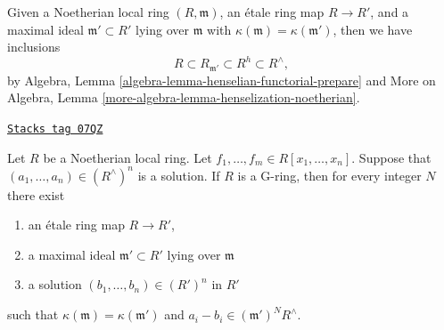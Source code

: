 Given a Noetherian local ring $(R, \mathfrak m)$, an \'etale
ring map $R \to R'$, and a maximal ideal $\mathfrak m' \subset R'$
lying over $\mathfrak m$ with $\kappa(\mathfrak m) = \kappa(\mathfrak m')$,
then we have inclusions
$$
R \subset R_{\mathfrak m'} \subset R^h \subset R^\wedge,
$$
by Algebra, Lemma \ref{algebra-lemma-henselian-functorial-prepare} and
More on Algebra, Lemma \ref{more-algebra-lemma-henselization-noetherian}.

\begin{theorem}
\label{smoothing-theorem-approximation-property-variant}
\href{https://stacks.math.columbia.edu/tag/07QZ}{\texttt{Stacks tag 07QZ}}

Let $R$ be a Noetherian local ring. Let
$f_1, \ldots, f_m \in R[x_1, \ldots, x_n]$.
Suppose that $(a_1, \ldots, a_n) \in (R^\wedge)^n$ is a solution.
If $R$ is a G-ring, then for every integer $N$ there exist
\begin{enumerate}
\item an \'etale ring map $R \to R'$,
\item a maximal ideal $\mathfrak m' \subset R'$ lying over $\mathfrak m$
\item a solution $(b_1, \ldots, b_n) \in (R')^n$ in $R'$
\end{enumerate}
such that $\kappa(\mathfrak m) = \kappa(\mathfrak m')$ and
$a_i - b_i \in (\mathfrak m')^NR^\wedge$.
\end{theorem}

